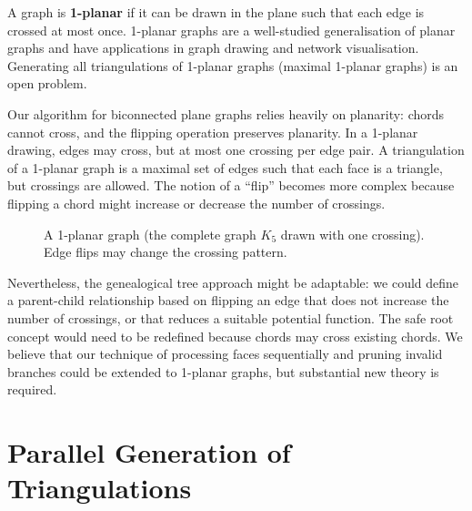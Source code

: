 A graph is \textbf{1-planar} if it can be drawn in the plane such that each edge is crossed at most once. 
1-planar graphs are a well-studied generalisation of planar graphs and have applications in graph drawing and network visualisation. 
Generating all triangulations of 1-planar graphs (maximal 1-planar graphs) is an open problem.

Our algorithm for biconnected plane graphs relies heavily on planarity: chords cannot cross, and the flipping operation preserves planarity. 
In a 1-planar drawing, edges may cross, but at most one crossing per edge pair. 
A triangulation of a 1-planar graph is a maximal set of edges such that each face is a triangle, but crossings are allowed. 
The notion of a “flip” becomes more complex because flipping a chord might increase or decrease the number of crossings.

\begin{figure}[htbp]
    \centering
    \caption{A 1-planar graph (the complete graph \(K_5\) drawn with one crossing). 
    Edge flips may change the crossing pattern.}
    \label{fig:one_planar}
\end{figure}

Nevertheless, the genealogical tree approach might be adaptable: we could define a parent-child relationship based on flipping an edge that does not increase the number of crossings, or that reduces a suitable potential function. 
The safe root concept would need to be redefined because chords may cross existing chords. 
We believe that our technique of processing faces sequentially and pruning invalid branches could be extended to 1-planar graphs, but substantial new theory is required.

\section{Parallel Generation of Triangulations}
\label{sec:parallel}

